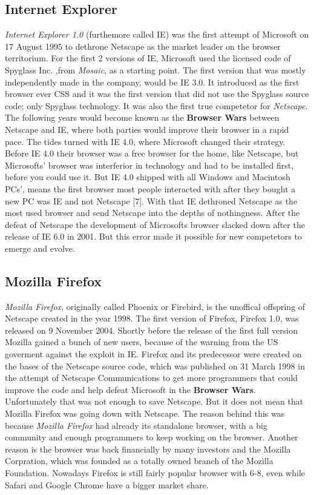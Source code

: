 \documentclass[runningheads]{llncs}
\begin{document}
		\subsection{Internet Explorer}
		\textit{Internet Explorer 1.0} (furthemore called IE) was the first attempt of Microsoft on 17 August 1995 to dethrone Netscape as the market leader on the browser territorium. For the first 2 versions of IE, Microsoft used the licensed code of Spyglass Inc. ,from \textit{Mosaic}, as a starting point. The first version that was mostly independently made in the company, would be IE 3.0. It introduced as the first browser ever CSS and it was the first version that did not use the Spyglass source code; only Spyglass technology. It was also the first true competetor for \textit{Netscape}. The following years would become known as the \textbf{Browser Wars} between Netscape and IE, where both parties would improve their browser in a rapid pace. The tides turned with IE 4.0, where Microsoft changed their strategy. Before IE 4.0 their browser was a free browser for the home, like Netscape, but Microsofts' browser was interferior in technology and had to be installed first, before you could use it. But IE 4.0 shipped with all Windows and Macintosh PCs', means the first browser most people interacted with after they bought a new PC was IE and not Netscape [7]. With that IE dethroned Netscape as the most used browser and send Netscape into the depths of nothingness. After the defeat of Netscape the development of Microsofts browser slacked down after the release of IE 6.0 in 2001. But this error made it possible for new competetors to emerge and evolve.
		\subsection{Mozilla Firefox}
		\textit{Mozilla Firefox}, originally called Phoenix or Firebird, is the unoffical offspring of Netscape created in the year 1998. The first version of Firefox, Firefox 1.0, was released on 9 November 2004. Shortly before the release of the first full version Mozilla gained a bunch of new users, because of the warning from the US goverment against the exploit in IE. Firefox and its predecessor were created on the bases of the Netscape source code, which was published on 31 March 1998 in the attempt of Netscape Communications to get more programmers that could improve the code and help defeat Microsoft in the \textbf{Browser Wars}. Unfortunately that was not enough to save Netscape. But it does not mean that Mozilla Firefox was going down with Netscape. The reason behind this was because \textit{Mozilla Firefox} had already its standalone browser, with a big community and enough  programmers  to keep working on the browser. Another reason is the browser was back financially by many investors and the Mozilla Corpration, which was founded as a totally owned branch of the Mozilla Foundation. Nowadays Firefox is still fairly popular browser with 6-8, even while Safari and Google Chrome have a bigger market share.
\end{document}

